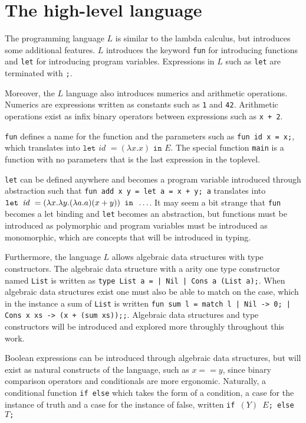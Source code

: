 \section{The high-level language}
The programming language $L$ is similar to the lambda calculus, but introduces some additional features.
$L$ introduces the keyword \texttt{fun} for introducing functions and \texttt{let} for introducing program variables.
Expressions in $L$ such as \texttt{let} are terminated with \texttt{;}.

Moreover, the $L$ language also introduces numerics and arithmetic operations.
Numerics are expressions written as constants such as \texttt{1} and \texttt{42}.
Arithmetic operations exist as infix binary operators between expressions such as \texttt{x + 2}.

\texttt{fun} defines a name for the function and the parameters such as \texttt{fun id x = x;}, which translates into $\texttt{let } \textit{id } = (\lambda x.x) \texttt{ in } E$.
The special function \texttt{main} is a function with no parameters that is the last expression in the toplevel.

\texttt{let} can be defined anywhere and becomes a program variable introduced through abstraction such that \texttt{fun add x y = let a = x + y; a} translates into $\letexp{id}{(\lambda x. \lambda y. (\lambda a.a) (x + y))}{\dots}$.
It may seem a bit strange that \texttt{fun} becomes a let binding and \texttt{let} becomes an abstraction, but functions must be introduced as polymorphic and program variables must be introduced as monomorphic, which are concepts that will be introduced in typing.

Furthermore, the language $L$ allows algebraic data structures with type constructors.
The algebraic data structure with a arity one type constructor named \texttt{List} is written as \texttt{type List a = | Nil | Cons a (List a);}.
When algebraic data structures exist one must also be able to match on the case, which in the instance a sum of \texttt{List} is written \texttt{fun sum l = match l | Nil -> 0; | Cons x xs -> (x + (sum xs));;}.
Algebraic data structures and type constructors will be introduced and explored more throughly throughout this work.

Boolean expressions can be introduced through algebraic data structures, but will exist as natural constructs of the language, such as \texttt{$x == y$}, since binary comparison operators and conditionals are more ergonomic.
Naturally, a conditional function \texttt{if else} which takes the form of a condition, a case for the instance of truth and a case for the instance of false, written \texttt{if $(Y)$ $E$; else $T$;}

